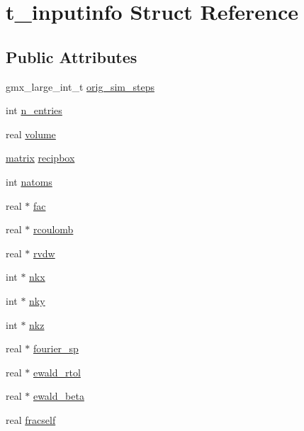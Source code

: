 \hypertarget{structt__inputinfo}{\section{t\-\_\-inputinfo \-Struct \-Reference}
\label{structt__inputinfo}
}
\subsection*{\-Public \-Attributes}
\begin{DoxyCompactItemize}
\item 
gmx\-\_\-large\-\_\-int\-\_\-t \hyperlink{structt__inputinfo_a67a95f2bfe896753a62d18d1347b4694}{orig\-\_\-sim\-\_\-steps}
\item 
int \hyperlink{structt__inputinfo_aa3c4ff1ab1d71c8e9f47921795fe882f}{n\-\_\-entries}
\item 
real \hyperlink{structt__inputinfo_a31b42a83227787a1831dfbac17983fe6}{volume}
\item 
\hyperlink{share_2template_2gromacs_2types_2simple_8h_a7ea9c2a830d3f743b887387e33645a83}{matrix} \hyperlink{structt__inputinfo_a3655a5ee90bed880a981c2c4c721c51d}{recipbox}
\item 
int \hyperlink{structt__inputinfo_a552a8ab6496f114c900c2396f8e19a79}{natoms}
\item 
real $\ast$ \hyperlink{structt__inputinfo_a391e6b3b81d1a951c8db6c83786a0445}{fac}
\item 
real $\ast$ \hyperlink{structt__inputinfo_ac9f4fcbffa7c6e3284d27ac963773df0}{rcoulomb}
\item 
real $\ast$ \hyperlink{structt__inputinfo_a9f5c9e3a9f858533ec964ece531d7a78}{rvdw}
\item 
int $\ast$ \hyperlink{structt__inputinfo_a86d018b68e9451b579a58a957bef8bda}{nkx}
\item 
int $\ast$ \hyperlink{structt__inputinfo_ad8156c33b1909515f57f67ff14b2417a}{nky}
\item 
int $\ast$ \hyperlink{structt__inputinfo_af15fb1d8790ef4323992481cfa54dc40}{nkz}
\item 
real $\ast$ \hyperlink{structt__inputinfo_a7805e440f29917a6d0319b68d0567f5c}{fourier\-\_\-sp}
\item 
real $\ast$ \hyperlink{structt__inputinfo_a8839f11c0ab53b4f826d6821c4f839bb}{ewald\-\_\-rtol}
\item 
real $\ast$ \hyperlink{structt__inputinfo_a82eb145f8e09fe106574513582b0f2cc}{ewald\-\_\-beta}
\item 
real \hyperlink{structt__inputinfo_abb8d49a7c48f1bee800f315852df9891}{fracself}

\end{DoxyCompactItemize}
